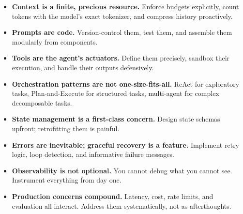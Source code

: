 \begin{itemize}
  \item \textbf{Context is a finite, precious resource.} Enforce budgets explicitly, count tokens with the model’s exact tokenizer, and compress history proactively.
  \item \textbf{Prompts are code.} Version-control them, test them, and assemble them modularly from components.
  \item \textbf{Tools are the agent’s actuators.} Define them precisely, sandbox their execution, and handle their outputs defensively.
  \item \textbf{Orchestration patterns are not one-size-fits-all.} ReAct for exploratory tasks, Plan-and-Execute for structured tasks, multi-agent for complex decomposable tasks.
  \item \textbf{State management is a first-class concern.} Design state schemas upfront; retrofitting them is painful.
  \item \textbf{Errors are inevitable; graceful recovery is a feature.} Implement retry logic, loop detection, and informative failure messages.
  \item \textbf{Observability is not optional.} You cannot debug what you cannot see. Instrument everything from day one.
  \item \textbf{Production concerns compound.} Latency, cost, rate limits, and evaluation all interact. Address them systematically, not as afterthoughts.
\end{itemize}

